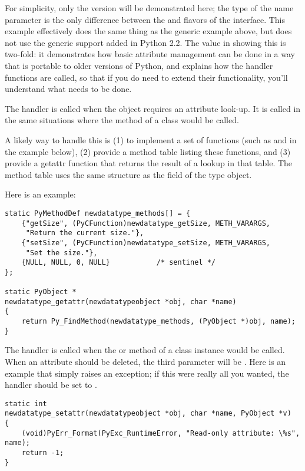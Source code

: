 For simplicity, only the  version will be demonstrated
here; the type of the name parameter is the only difference between
the  and  flavors of the interface.
This example effectively does the same thing as the generic example
above, but does not use the generic support added in Python 2.2.  The
value in showing this is two-fold: it demonstrates how basic attribute
management can be done in a way that is portable to older versions of
Python, and explains how the handler functions are called, so that if
you do need to extend their functionality, you'll understand what
needs to be done.

The  handler is called when the object requires an
attribute look-up.  It is called in the same situations where the
 method of a class would be called.

A likely way to handle this is (1) to implement a set of functions
(such as  and
 in the example below), (2) provide a
method table listing these functions, and (3) provide a getattr
function that returns the result of a lookup in that table.  The
method table uses the same structure as the  field
of the type object.

Here is an example:

\begin{verbatim}
static PyMethodDef newdatatype_methods[] = {
    {"getSize", (PyCFunction)newdatatype_getSize, METH_VARARGS,
     "Return the current size."},
    {"setSize", (PyCFunction)newdatatype_setSize, METH_VARARGS,
     "Set the size."},
    {NULL, NULL, 0, NULL}           /* sentinel */
};

static PyObject *
newdatatype_getattr(newdatatypeobject *obj, char *name)
{
    return Py_FindMethod(newdatatype_methods, (PyObject *)obj, name);
}
\end{verbatim}

The  handler is called when the
 or  method of a class
instance would be called.  When an attribute should be deleted, the
third parameter will be \NULL.  Here is an example that simply raises
an exception; if this were really all you wanted, the
 handler should be set to \NULL.
   
\begin{verbatim}
static int
newdatatype_setattr(newdatatypeobject *obj, char *name, PyObject *v)
{
    (void)PyErr_Format(PyExc_RuntimeError, "Read-only attribute: \%s", name);
    return -1;
}
\end{verbatim}


